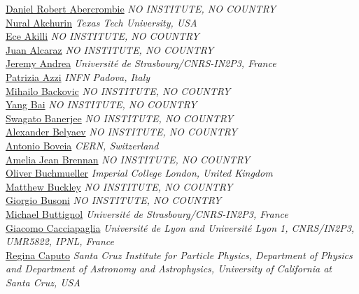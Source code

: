 \noindent\href{mailto:daniel.abercrombie@cern.ch}{Daniel Robert Abercrombie} 
\emph{NO INSTITUTE, NO COUNTRY}\\
\noindent\href{mailto:nural.akchurin@cern.ch}{Nural Akchurin} 
\emph{Texas Tech University, USA}\\
\noindent\href{mailto:ece.akilli@cern.ch}{Ece Akilli} 
\emph{NO INSTITUTE, NO COUNTRY}\\
\noindent\href{mailto:juan.alcaraz@cern.ch}{Juan Alcaraz} 
\emph{NO INSTITUTE, NO COUNTRY}\\
\noindent\href{mailto:Jeremy.Andrea@cern.ch}{Jeremy Andrea} 
\emph{Universit\'e de Strasbourg/CNRS-IN2P3, France}\\
\noindent\href{mailto:Patrizia.Azzi@cern.ch}{Patrizia Azzi} 
\emph{INFN Padova, Italy}\\
\noindent\href{mailto:mbackovic@gmail.com}{Mihailo Backovic} 
\emph{NO INSTITUTE, NO COUNTRY}\\
\noindent\href{mailto:yangbai@physics.wisc.edu}{Yang Bai} 
\emph{NO INSTITUTE, NO COUNTRY}\\
\noindent\href{mailto:swagato.banerjee@gmail.com}{Swagato Banerjee} 
\emph{NO INSTITUTE, NO COUNTRY}\\
\noindent\href{mailto:Alexander.Belyaev@cern.ch}{Alexander Belyaev} 
\emph{NO INSTITUTE, NO COUNTRY}\\
\noindent\href{mailto:antonio.boveia@cern.ch}{Antonio Boveia} 
\emph{CERN, Switzerland}\\
\noindent\href{mailto:amelia.jean.brennan@cern.ch}{Amelia Jean Brennan} 
\emph{NO INSTITUTE, NO COUNTRY}\\
\noindent\href{mailto:Oliver.Buchmueller@Cern.ch}{Oliver Buchmueller} 
\emph{Imperial College London, United Kingdom}\\
\noindent\href{mailto:mbuckley@physics.rutgers.edu}{Matthew Buckley} 
\emph{NO INSTITUTE, NO COUNTRY}\\
\noindent\href{mailto:giorgio.busoni@sissa.it}{Giorgio Busoni} 
\emph{NO INSTITUTE, NO COUNTRY}\\
\noindent\href{mailto:Michael.Buttignol@cern.ch}{Michael Buttignol} 
\emph{ Universit\'e de Strasbourg/CNRS-IN2P3, France}\\
\noindent\href{mailto:cacciapa@ipnl.in2p3.fr}{Giacomo Cacciapaglia} 
\emph{Universit\'e de Lyon and Universit\'e Lyon 1, CNRS/IN2P3, UMR5822, IPNL, France}\\
\noindent\href{mailto:Regina.Caputo@cern.ch}{Regina Caputo} 
\emph{Santa Cruz Institute for Particle Physics, Department of Physics and Department of Astronomy and Astrophysics, University of California at Santa Cruz, USA}\\
